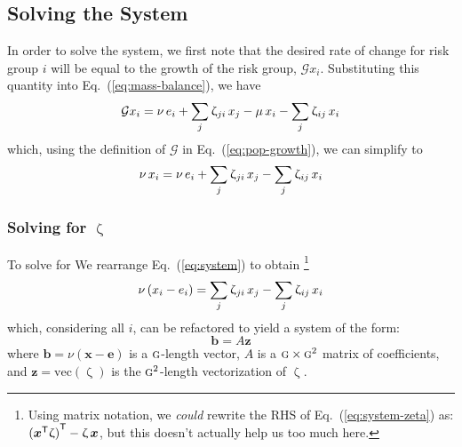 \documentclass{article}
\numberwithin{equation}{section}
\newcommand{\eq}[1]{Eq.~(\ref{#1})}
\renewcommand{\zeta}{\upzeta}
\newcommand{\G}{\textsc{g}}
\begin{document}
\subsection{Solving the System}
In order to solve the system, we first note that the desired rate of change for risk group $i$
will be equal to the growth of the risk group, $\mathcal{G} x_i$.
Substituting this quantity into \eq{eq:mass-balance}, we have
\begin{equation}
  \mathcal{G}x_i = \nu \thinspace e_i + \sum_{j}{\zeta_{ji} \thinspace x_j}
                 - \mu \thinspace x_i - \sum_{j}{\zeta_{ij} \thinspace x_i}
\end{equation}
which, using the definition of $\mathcal{G}$ in \eq{eq:pop-growth}, we can simplify to
\begin{equation}
  \nu \thinspace x_i
      = \nu \thinspace e_i + \sum_{j}{\zeta_{ji} \thinspace x_j}
                           - \sum_{j}{\zeta_{ij} \thinspace x_i}
  \label{eq:system}
\end{equation}
\subsubsection{Solving for $\zeta$}\label{sss:solve-zeta}
To solve for We rearrange \eq{eq:system} to obtain
\footnote{
  Using matrix notation, we \textit{could} rewrite the RHS of \eq{eq:system-zeta} as:
  ${({\bm{x}}^{\mathsf{T}}\zeta)}^{\mathsf{T}} - \zeta \thinspace \bm{x}$, %
  but this doesn't actually help us too much here.}
\begin{equation}\label{eq:system-zeta}
  \nu \left( x_i - e_i \right)
  = \sum_{j}{\zeta_{ji} \thinspace x_j}
  - \sum_{j}{\zeta_{ij} \thinspace x_i}
\end{equation}
which, considering all $i$, can be refactored to yield a system of the form:
\begin{equation}
\bm{b} = A \bm{z}
\end{equation}
where
$\bm{b} = \nu (\bm{x} - \bm{e})$ is a $\G$-length vector,
$A$ is a ${\G}\times\G^2$ matrix of coefficients, and
$\bm{z} = \mathrm{vec}(\zeta)$ is the $\G^2$-length vectorization of $\zeta$.
\end{document}
